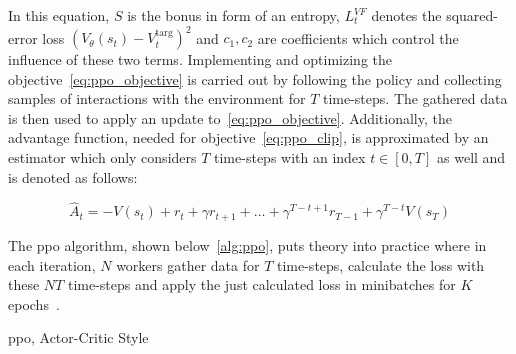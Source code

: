 \documentclass[draft,final]{vutinfth} %
\newcommand{\p}[1]{see p. #1}
\begin{document}
    In this equation, $S$ is the bonus in form of an entropy, $L_t^{VF}$ denotes the squared-error loss $(V_\theta(s_t)-V_t^{\text{targ}})^2$ and $c_1,c_2$ are coefficients which control the influence of these two terms.
    Implementing and optimizing the objective~\ref{eq:ppo_objective} is carried out by following the policy and collecting samples of interactions with the environment for $T$ time-steps.
    The gathered data is then used to apply an update to~\ref{eq:ppo_objective}.
    Additionally, the advantage function, needed for objective~\ref{eq:ppo_clip}, is approximated by an estimator which only considers $T$ time-steps with an index $t\in [0,T]$ as well and is denoted as follows:

    \begin{equation}
        \hat{A}_t=-V(s_t)+r_t+\gamma r_{t+1} + \dots + \gamma^{T-t+1}r_{T-1} + \gamma^{T-t}V(s_T)\label{eq:advantage_estimator}
    \end{equation}

    The \gls{ppo} algorithm, shown below~\eqref{alg:ppo}, puts theory into practice where in each iteration, $N$ workers gather data for $T$ time-steps, calculate the loss with these $NT$ time-steps and apply the just calculated loss in minibatches for $K$ epochs~\citep{francois-lavet_introduction_2018}.
    \newpage
    \begin{algorithm}
        \caption[\gls{ppo}, Actor-Critic Style]{\gls{ppo}, Actor-Critic Style\protect\footnotemark}
        \label{alg:ppo}




    \end{algorithm}

    \footnotetext{\citep[\p{5}]{schulman_proximal_2017}}

    \glsresetall
\end{document}
